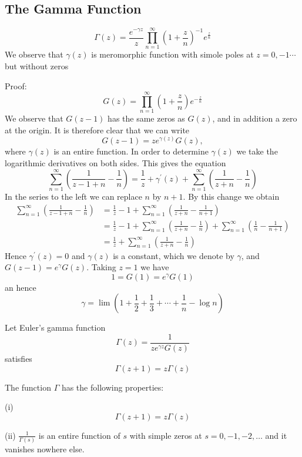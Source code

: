 \documentclass[12pt, oneside]{book}
\begin{document}
\subsection{The Gamma Function}
\begin{definition}
    $$\Gamma(z) = \frac{e^{- \gamma z}}{z} \prod_{n=1}^\infty \left(1 +\frac{z}{n}\right)^{-1} e^{\frac{z}{n}}$$
    We observe that $\gamma(z)$ is meromorphic function with simole poles at $z = 0,-1 \cdots$ but without zeros



    Proof:
    $$G(z)=\prod_{n=1}^\infty \left( 1 + \frac{z}{n}\right) e^{-\frac{z}{n}}$$
    We observe that $G(z-1)$ has the same zeros as $G(z)$, and in addition a zero at the origin. It is therefore clear that we can write
    $$
        G(z-1)=z e^{\gamma(z)} G(z),
    $$
    where $\gamma(z)$ is an entire function. In order to determine $\gamma(z)$ we take the logarithmic derivatives on both sides. This gives the equation
    $$
        \sum_{n=1}^{\infty}\left(\frac{1}{z-1+n}-\frac{1}{n}\right)=\frac{1}{z}+\gamma^{\prime}(z)+\sum_{n=1}^{\infty}\left(\frac{1}{z+n}-\frac{1}{n}\right)
    $$
    In the series to the left we can replace $n$ by $n+1$. By this change we obtain
    $$
        \begin{aligned}
            \sum_{n=1}^{\infty}\left(\frac{1}{z-1+n}-\frac{1}{n}\right) & =\frac{1}{z}-1+\sum_{n=1}^{\infty}\left(\frac{1}{z+n}-\frac{1}{n+1}\right)                                                         \\
                                                                        & =\frac{1}{z}-1+\sum_{n=1}^{\infty}\left(\frac{1}{z+n}-\frac{1}{n}\right)+\sum_{n=1}^{\infty}\left(\frac{1}{n}-\frac{1}{n+1}\right) \\
                                                                        & =\frac{1}{z}+\sum_{n=1}^{\infty}\left(\frac{1}{z+n}-\frac{1}{n}\right)
        \end{aligned}
    $$
    Hence $\gamma^{\prime}(z)=0$ and $\gamma(z)$ is a constant, which we denote by $\gamma$, and $G(z-1) = e^\gamma G(z)$. Taking $z=1$ we have
    $$1=G(1)=e^\gamma G(1)$$
    an hence
    $$\gamma=\lim\left(1 + \frac{1}{2} + \frac{1}{3}+ \cdots + \frac{1}{n} - \log n \right)$$

    Let Euler's gamma function
    $$\Gamma(z) = \frac{1}{z e^{\gamma z} G(z)}$$
    satisfies
    $$\Gamma(z+1) = z \Gamma (z)$$
\end{definition}
\begin{proposition}
    The function $\Gamma$ has the following properties:

    (i)
    \[
        \Gamma(z+1)= z\Gamma(z)
    \]

    (ii) $\frac{1}{\Gamma(s)}$ is an entire function of $s$ with simple zeros at $s=0,-1,-2, \ldots$ and it vanishes nowhere else.
\end{proposition}
\end{document}
